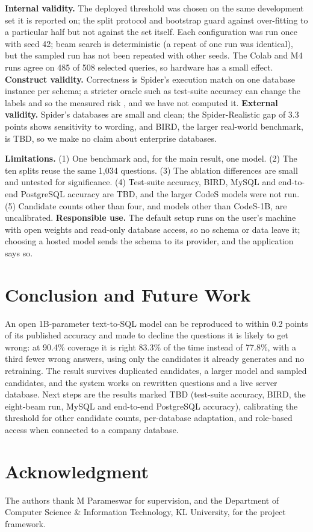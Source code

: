 \documentclass[conference]{IEEEtran}
\begin{document}
\textbf{Internal validity.} The deployed threshold was chosen on the same development set it is reported on; the split protocol and bootstrap guard against over-fitting to a particular half but not against the set itself. Each configuration was run once with seed 42; beam search is deterministic (a repeat of one run was identical), but the sampled run has not been repeated with other seeds. The Colab and M4 runs agree on 485 of 508 selected queries, so hardware has a small effect. \textbf{Construct validity.} Correctness is Spider's execution match on one database instance per schema; a stricter oracle such as test-suite accuracy can change the labels and so the measured risk \cite{liu2026certified}, and we have not computed it. \textbf{External validity.} Spider's databases are small and clean; the Spider-Realistic gap of 3.3 points shows sensitivity to wording, and BIRD, the larger real-world benchmark, is TBD, so we make no claim about enterprise databases.

\textbf{Limitations.} (1) One benchmark and, for the main result, one model. (2) The ten splits reuse the same 1,034 questions. (3) The ablation differences are small and untested for significance. (4) Test-suite accuracy, BIRD, MySQL and end-to-end PostgreSQL accuracy are TBD, and the larger CodeS models were not run. (5) Candidate counts other than four, and models other than CodeS-1B, are uncalibrated. \textbf{Responsible use.} The default setup runs on the user's machine with open weights and read-only database access, so no schema or data leave it; choosing a hosted model sends the schema to its provider, and the application says so.

\section{Conclusion and Future Work}
An open 1B-parameter text-to-SQL model can be reproduced to within 0.2 points of its published accuracy and made to decline the questions it is likely to get wrong: at 90.4\% coverage it is right 83.3\% of the time instead of 77.8\%, with a third fewer wrong answers, using only the candidates it already generates and no retraining. The result survives duplicated candidates, a larger model and sampled candidates, and the system works on rewritten questions and a live server database. Next steps are the results marked TBD (test-suite accuracy, BIRD, the eight-beam run, MySQL and end-to-end PostgreSQL accuracy), calibrating the threshold for other candidate counts, per-database adaptation, and role-based access when connected to a company database.

\section*{Acknowledgment}
The authors thank M Parameswar for supervision, and the Department of Computer Science \& Information Technology, KL University, for the project framework.



\end{document}

